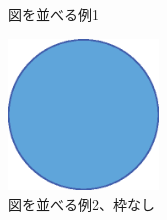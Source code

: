 \begin{figure}[htbp]
  \begin{minipage}{0.5\hsize}
    \begin{center}
    \end{center}
    \caption{図を並べる例1}
    \label{fig:sample2}
  \end{minipage}
  \begin{minipage}{0.5\hsize}
    \begin{center}
       \includegraphics[width=40mm]{image.eps}
    \end{center}
    \caption{図を並べる例2、枠なし}
    \label{fig:sample3}
  \end{minipage}
\end{figure}

